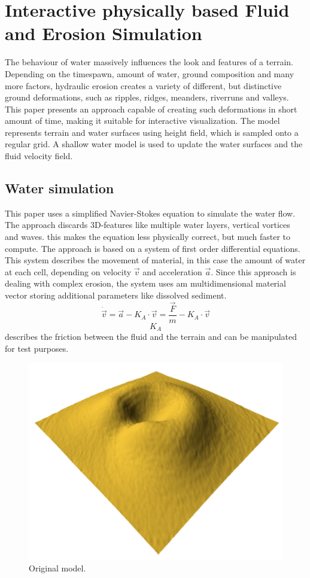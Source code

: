 \section{Interactive physically based Fluid and Erosion Simulation}
The behaviour of water massively influences the look and features of a terrain. Depending on the timespawn, amount of water, ground composition and many more factors, hydraulic erosion creates a variety of different, but distinctive ground deformations, such as ripples, ridges, meanders, riverruns and valleys. 
This paper \cite{Neidhold:2005:IPB:2381356.2381361} presents an approach capable of creating such deformations in short amount of time, making it suitable for interactive visualization. The model represents terrain and water surfaces using height field, which is sampled onto a regular grid. A shallow water model is used to update the water surfaces and the fluid velocity field. 

\subsection{Water simulation}
This paper uses a simplified Navier-Stokes equation to simulate the water flow. The approach discards 3D-features like multiple water layers, vertical vortices and waves. this makes the equation less physically correct, but much faster to compute. The approach is based on a system of first order differential equations. This system describes the movement of material, in this case the amount of water at each cell, depending on velocity $\vec{v}$ and acceleration $\vec{a}$. Since this approach is dealing with complex erosion, the system uses am multidimensional material vector storing additional parameters like dissolved sediment.
$$\dot{\vec{v}} = \vec{a} -K_A \cdot \vec{v}=\frac{\vec{F}}{m} - K_A\cdot \vec{v}$$
$$K_A$$ describes the friction between the fluid and the terrain and can be manipulated for test purposes. 

\begin{figure}
	\centering
	\includegraphics[width=\linewidth]{NWD05/hydraulic_errosion_a}
	\caption{Original model.}
	\label{fig:calc_acceleration}
\end{figure}

